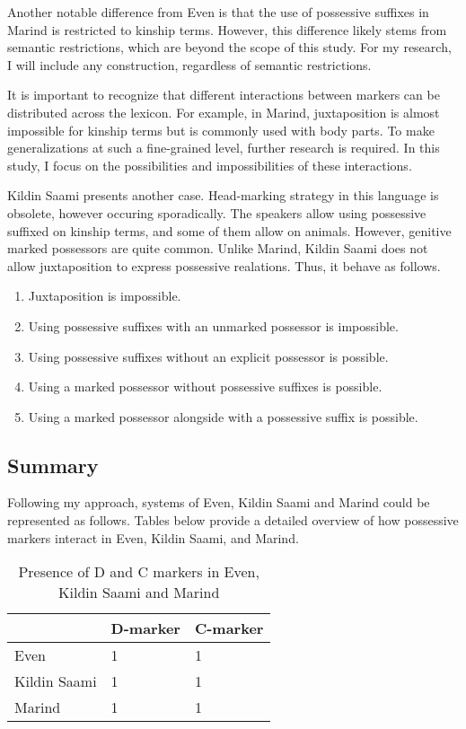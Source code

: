 Another notable difference from Even is that the use of possessive suffixes in Marind is restricted to kinship terms. However, this difference likely stems from semantic restrictions, which are beyond the scope of this study. For my research, I will include any construction, regardless of semantic restrictions.

It is important to recognize that different interactions between markers can be distributed across the lexicon. For example, in Marind, juxtaposition is almost impossible for kinship terms but is commonly used with body parts. To make generalizations at such a fine-grained level, further research is required. In this study, I focus on the possibilities and impossibilities of these interactions.

Kildin Saami presents another case. Head-marking strategy in this language is obsolete, however occuring sporadically. The speakers allow using possessive suffixed on kinship terms, and some of them allow on animals. However, genitive marked possessors are quite common. Unlike Marind, Kildin Saami does not allow juxtaposition to express possessive realations. Thus, it behave as follows.

\begin{enumerate}
	\item Juxtaposition is impossible.
	\item Using possessive suffixes with an unmarked possessor is impossible.
	\item Using possessive suffixes without an explicit possessor is possible.
	\item Using a marked possessor without possessive suffixes is possible.
	\item Using a marked possessor alongside with a possessive suffix is possible.
\end{enumerate}

\subsection*{Summary}

Following my approach, systems of Even, Kildin Saami and Marind could be represented as follows. Tables below provide a detailed overview of how possessive markers interact in Even, Kildin Saami, and Marind.

\begin{table}[h!]
	\centering
	\begin{tabular}{@{}lll@{}}
		\toprule
		& D-marker & C-marker \\ \midrule
		Even         & 1        & 1        \\
		Kildin Saami & 1        & 1        \\
		Marind       & 1        & 1        \\ \bottomrule
	\end{tabular}
	\caption{Presence of D and C markers in Even, Kildin Saami and Marind}
\end{table}

